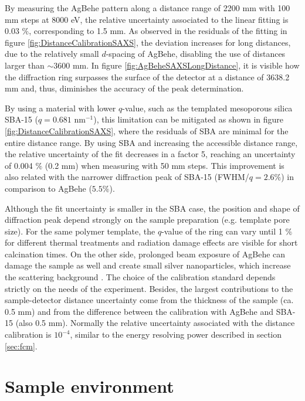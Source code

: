 By measuring the AgBehe pattern along a distance range of 2200 mm with 100 mm steps at 8000 eV, the relative uncertainty associated to the linear fitting is 0.03 $\%$, corresponding to 1.5 mm. As observed in the residuals of the fitting in figure \ref{fig:DistanceCalibrationSAXS}, the deviation increases for long distances, due to the relatively small $d$-spacing of AgBehe, disabling the use of distances larger than $\sim 3600$ mm. In figure \ref{fig:AgBeheSAXSLongDistance}, it is visible how the diffraction ring surpasses the surface of the detector at a distance of 3638.2 mm and, thus, diminishes the accuracy of the peak determination.

By using a material with lower $q$-value, such as the templated mesoporous silica SBA-15 \citep{zhao_triblock_1998} ($q=0.681$ nm$^{-1}$), this limitation can be mitigated as shown in figure \ref{fig:DistanceCalibrationSAXS}, where the residuals of SBA are minimal for the entire distance range. By using SBA and increasing the accessible distance range, the relative uncertainty of the fit decreases in a factor 5, reaching an uncertainty of 0.004 $\%$ (0.2 mm) when measuring with 50 mm steps. This improvement is also related with the narrower diffraction peak of SBA-15 (FWHM/$q=2.6\%$) in comparison to AgBehe ($5.5\%$).

Although the fit uncertainty is smaller in the SBA case, the position and shape of diffraction peak depend strongly on the sample preparation (e.g. template pore size). For the same polymer template, the $q$-value of the ring can vary until 1 $\%$ for different thermal treatments and radiation damage effects are visible for short calcination times. On the other side, prolonged beam exposure of AgBehe can damage the sample as well and create small silver nanoparticles, which increase the scattering background \citep{liu_thermal_2006}. The choice of the calibration standard depends strictly on the needs of the experiment. Besides, the largest contributions to the sample-detector distance uncertainty come from the thickness of the sample (ca. 0.5 mm) and from the difference between the calibration with AgBehe and SBA-15 (also 0.5 mm). Normally the relative uncertainty associated with the distance calibration is $10^{-4}$, similar to the energy resolving power described in section \ref{sec:fcm}.

\section{Sample environment}
\label{sec:sample_environment}


